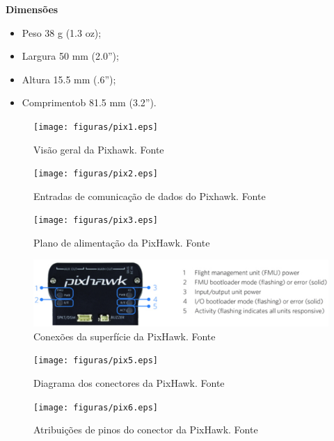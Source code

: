 \textbf{Dimensões}
\begin{itemize}
\item Peso 38 g (1.3 oz);
\item Largura 50 mm (2.0”);
\item Altura 15.5 mm (.6”);
\item Comprimentob 81.5 mm (3.2”).
\end{itemize}
\begin{figure}[H]
	\centering
	  \texttt{[image: figuras/pix1.eps]}
	\caption{Visão geral da Pixhawk. Fonte \cite{pixhawk}}
	\label{fig:pix1}
\end{figure}

\begin{figure}[H]
	\centering
	  \texttt{[image: figuras/pix2.eps]}
	\caption{Entradas  de comunicação de dados  do Pixhawk. Fonte \cite{pixhawk}}
	\label{fig:pix2}
\end{figure}

\pagebreak
\begin{figure}[H]
	\centering
	  \texttt{[image: figuras/pix3.eps]}
	\caption{Plano de alimentação da PixHawk. Fonte \cite{pixhawk}}
	\label{fig:pix3}
\end{figure}

\begin{figure}[H]
	\centering
	  \includegraphics[keepaspectratio=true,scale=0.6]{figuras/pix4.eps}
	\caption{Conexões da superfície da PixHawk. Fonte \cite{pixhawk}}
	\label{fig:pix4}
\end{figure}

\begin{figure}[H]
	\centering
	  \texttt{[image: figuras/pix5.eps]}
	\caption{Diagrama dos conectores da PixHawk. Fonte \cite{pixhawk}}
	\label{fig:pix5}
\end{figure}

\begin{figure}[H]
	\centering
	  \texttt{[image: figuras/pix6.eps]}
	\caption{Atribuições de pinos do conector da PixHawk. Fonte \cite{pixhawk}}
	\label{fig:pix6}
\end{figure}

